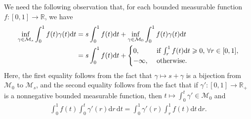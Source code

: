 \documentclass[11pt]{amsart}
\theoremstyle{remark}
\theoremstyle{definition}
\numberwithin{equation}{section}
\numberwithin{proposition}{section}
\numberwithin{figure}{section}
\numberwithin{table}{section}
\newcommand{\R}{\mathbb{R}}
\newcommand{\E}{\mathbb{E}}
\renewcommand{\leq}{\leqslant}
\renewcommand{\geq}{\geqslant}
\newcommand{\Ll}{\left}
\newcommand{\Rr}{\right}
\renewcommand{\d}{\mathrm{d}}
\newcommand{\1}{\mathbf{1}}
\newcommand{\mcl}{\mathcal}
\newcommand{\al}{\alpha}
\newcommand{\bmart}{\mathbf{Mart}}
\newcommand{\cM}{\mathcal{M}}
\begin{document}

We need the following observation that, for each bounded measurable function $f:[0,1]\to\R$, we have
\begin{align}\label{e.compute_inf_gamma}
    \inf_{\gamma\in\mcl M_s}\int_0^1 f(t)\gamma(t)\d t &= s \int_0^1 f(t)\d t + \inf_{\gamma\in\mcl M_0}\int_0^1 f(t)\gamma(t)\d t \notag
    \\ 
    &= s \int_0^1 f(t)\d t + 
    \begin{cases}
          0 ,\  &\text{if $\int_r^1  f(t)\d t\geq0$, $\forall r\in[0,1]$},
          \\
          -\infty ,\  &\text{otherwise}.
    \end{cases}
\end{align}
Here, the first equality follows from the fact that $\gamma\mapsto s+\gamma$ is a bijection from $\mcl M_0$ to $\mcl M_s$, and the second equality follows from the fact that if $\gamma' : [0,1] \to \R_+$ is a nonnegative bounded measurable function, then $t \mapsto \int_0^t \gamma' \in \mcl M_0$ and 
\begin{align*}  %
\int_0^1 f(t) \int_0^t \gamma'(r)  \d r \,   \d t = \int_0^1 \gamma'(r) \int_r^1 f(t) \d t \, \d r.
\end{align*}
\end{document}
